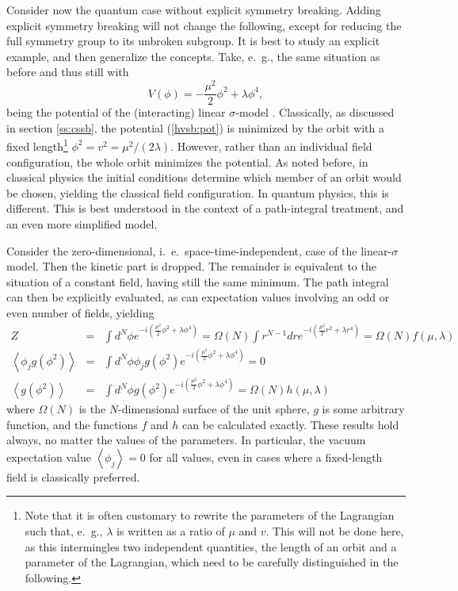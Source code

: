\documentclass[final,twoside,12pt]{article}
\newcommand*{\no}{\noindent}
\newcommand*{\bea}{\begin{eqnarray}}
\newcommand*{\eea}{\end{eqnarray}}
\newcommand*{\be}{\begin{equation}}
\newcommand*{\ee}{\end{equation}}
\newcommand*{\pref}[1]{(\ref{#1})}
\newcommand*{\nn}{\nonumber}
\newcommand*{\1}{1\!\!\!\bot}
\newcommand*{\la}{\left\langle}
\newcommand*{\ra}{\right\rangle}
\begin{document}
Consider now the quantum case \cite{O'Raifeartaigh:1978kv,Sartori:1992ib} without explicit symmetry breaking. Adding explicit symmetry breaking will not change the following, except for reducing the full symmetry group to its unbroken subgroup. It is best to study an explicit example, and then generalize the concepts. Take, e.\ g., the same situation as before and thus still with
\be
V(\phi)=-\frac{\mu^2}{2}\phi^2+\lambda\phi^4\label{hvsb:pot},
\ee
\no being the potential of the (interacting) linear $\sigma$-model \cite{Bohm:2001yx}. Classically, as discussed in section \ref{ss:cssb}, the potential \pref{hvsb:pot} is minimized by the orbit with a fixed length\footnote{Note that it is often customary to rewrite the parameters of the Lagrangian such that, e.\ g., $\lambda$ is written as a ratio of $\mu$ and $v$. This will not be done here, as this intermingles two independent quantities, the length of an orbit and a parameter of the Lagrangian, which need to be carefully distinguished in the following.} $\phi^2=v^2=\mu^2/(2\lambda)$. However, rather than an individual field configuration, the whole orbit minimizes the potential. As noted before, in classical physics the initial conditions determine which member of an orbit would be chosen, yielding the classical field configuration. In quantum physics, this is different. This is best understood in the context of a path-integral treatment, and an even more simplified model.

Consider the zero-dimensional, i.\ e.\ space-time-independent, case of the linear-$\sigma$ model. Then the kinetic part is dropped. The remainder is equivalent to the situation of a constant field, having still the same minimum. The path integral can then be explicitly evaluated, as can expectation values involving an odd or even number of fields, yielding
\bea
Z&=&\int d^N\phi e^{-i\left(\frac{\mu^2}{2}\phi^2+\lambda\phi^4\right)}=\Omega(N)\int r^{N-1}dr e^{-i\left(\frac{\mu^2}{2}r^2+\lambda r^4\right)}=\Omega(N)f(\mu,\lambda)\nn\\
\la\phi_j g(\phi^2)\ra&=&\int d^N\phi \phi_j g(\phi^2) e^{-i\left(\frac{\mu^2}{2}\phi^2+\lambda\phi^4\right)}=0\label{hvsb:vvev}\\
\la g(\phi^2)\ra&=&\int d^N\phi g(\phi^2) e^{-i\left(\frac{\mu^2}{2}\phi^2+\lambda\phi^4\right)}=\Omega(N)h(\mu,\lambda)\nn
\eea
\no where $\Omega(N)$ is the $N$-dimensional surface of the unit sphere, $g$ is some arbitrary function, and the functions $f$ and $h$ can be calculated exactly. These results hold always, no matter the values of the parameters. In particular, the vacuum expectation value $\la\phi_j\ra=0$ for all values, even in cases where a fixed-length field is classically preferred.
\end{document}
